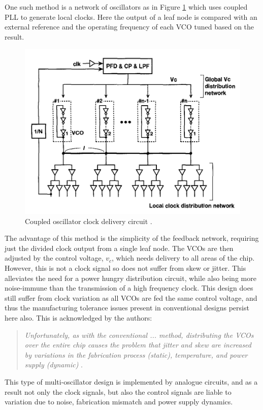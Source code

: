 One such method is a network of oscillators as in Figure \ref{fig:mizuno1998noise} which uses coupled \ac{PLL} to generate local clocks. Here the output of a leaf node is compared with an external reference and the operating frequency of each \ac{VCO} tuned based on the result.
\begin{figure}[h]
	\centering
	\includegraphics[scale=0.7]{../mizuno1998noise}
	\caption[Coupled oscillator clock delivery circuit]{Coupled oscillator clock delivery circuit \cite{mizuno1998noise}.}
	\label{fig:mizuno1998noise}
\end{figure}
The advantage of this method is the simplicity of the feedback network, requiring just the divided clock output from a single leaf node. The \acp{VCO} are then adjusted by the control voltage, $v_c$, which needs delivery to all areas of the chip. However, this is not a clock signal so does not suffer from skew or jitter. This alleviates the need for a power hungry distribution circuit, while also being more noise-immune than the transmission of a high frequency clock. This design does still suffer from clock variation as all \acp{VCO} are fed the same control voltage, and thus the manufacturing tolerance issues present in conventional designs persist here also. This is acknowledged by the authors:
\begin{quotation}
	\textit{Unfortunately, as with the conventional ... method, distributing the \acp{VCO} over the entire chip causes the problem that jitter and skew are increased by variations in the fabrication process (static), temperature, and power supply (dynamic)} \cite{mizuno1998noise}.
\end{quotation}
This type of multi-oscillator design is implemented by analogue circuits, and as a result not only the clock signals, but also the control signals are liable to variation due to noise, fabrication mismatch and power supply dynamics.

